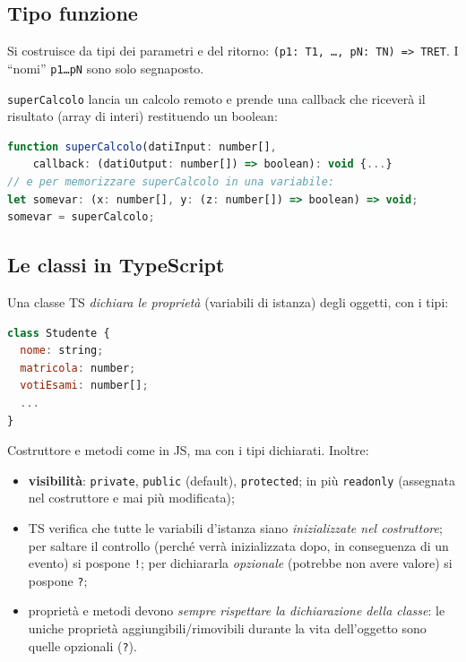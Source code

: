 \subsection{Tipo funzione}
Si costruisce da tipi dei parametri e del ritorno:
\texttt{(p1: T1, \dots, pN: TN) => TRET}. I ``nomi'' \texttt{p1\dots pN} sono solo
segnaposto.
\begin{esempio}
\texttt{superCalcolo} lancia un calcolo remoto e prende una callback che ricever\`a il
risultato (array di interi) restituendo un boolean:
\begin{lstlisting}[language=JavaScript]
function superCalcolo(datiInput: number[],
    callback: (datiOutput: number[]) => boolean): void {...}
// e per memorizzare superCalcolo in una variabile:
let somevar: (x: number[], y: (z: number[]) => boolean) => void;
somevar = superCalcolo;
\end{lstlisting}
\end{esempio}

\subsection{Le classi in TypeScript}
Una classe TS \emph{dichiara le propriet\`a} (variabili di istanza) degli oggetti, con i tipi:
\begin{lstlisting}[language=JavaScript]
class Studente {
  nome: string;
  matricola: number;
  votiEsami: number[];
  ...
}
\end{lstlisting}
Costruttore e metodi come in JS, ma con i tipi dichiarati. Inoltre:
\begin{itemize}
  \item \textbf{visibilit\`a}: \texttt{private}, \texttt{public} (default),
        \texttt{protected}; in pi\`u \texttt{readonly} (assegnata nel costruttore e mai
        pi\`u modificata);
  \item TS verifica che tutte le variabili d'istanza siano \emph{inizializzate nel
        costruttore}; per saltare il controllo (perch\'e verr\`a inizializzata dopo, in
        conseguenza di un evento) si pospone \texttt{!}; per dichiararla \emph{opzionale}
        (potrebbe non avere valore) si pospone \texttt{?};
  \item propriet\`a e metodi devono \emph{sempre rispettare la dichiarazione della classe}: le
        uniche propriet\`a aggiungibili/rimovibili durante la vita dell'oggetto sono quelle
        opzionali (\texttt{?}).
\end{itemize}

